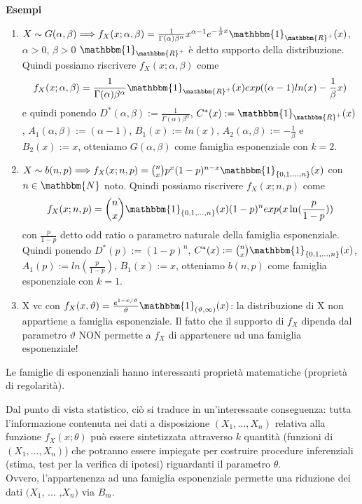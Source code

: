 \noindent \textbf{Esempi}
\begin{enumerate}
\item 
$X \sim G(\alpha, \beta) \Longrightarrow f_X(x; \alpha, \beta) = \frac{1}{\Gamma(\alpha) \beta^\alpha} x^{\alpha -1} e^{- \frac{1}{\beta} x} \mathbbm{1}_{\mathbbm{R}^+}(x)$, $\alpha >0$, $\beta >0$
$\mathbbm{1}_{\mathbbm{R}^+}$ è detto supporto della distribuzione.
Quindi possiamo riscrivere $f_X(x; \alpha, \beta)$ come
$$f_X(x; \alpha, \beta) = \frac{1}{\Gamma(\alpha) \beta^\alpha} \mathbbm{1}_{\mathbbm{R}^+}(x) exp((\alpha -1) ln(x) - \frac{1}{\beta} x)$$
e quindi ponendo $D^*(\alpha, \beta) := \frac{1}{\Gamma(\alpha) \beta^\alpha}$, $C^*(x) := \mathbbm{1}_{\mathbbm{R}^+}(x)$, $A_1(\alpha, \beta) := (\alpha -1)$, $B_1(x) := ln(x)$, $A_2(\alpha, \beta) := - \frac{1}{\beta}$ e $B_2(x) := x$, otteniamo $G(\alpha, \beta)$ come famiglia esponenziale con $k=2$.

\item $X \sim b(n,p) \Longrightarrow f_X(x; n,p) = \binom{n}{x} p^x (1-p)^{n-x} \mathbbm{1}_{\lbrace 0,1,...,n \rbrace}(x)$ con $n \in \mathbbm{N}$ noto.
Quindi possiamo riscrivere $f_X(x; n,p)$ come
$$f_X(x; n,p) = \binom{n}{x} \mathbbm{1}_{\lbrace 0,1,...,n \rbrace}(x) (1-p)^n exp(x \ln(\frac{p}{1-p}))$$ con $\frac{p}{1-p}$ detto odd ratio o parametro naturale della famiglia esponenziale.\\
Quindi ponendo $D^*(p) := (1-p)^n$, $C^*(x) := \binom{n}{x} \mathbbm{1}_{\lbrace 0,1,...,n \rbrace}(x)$, $A_1(p) := ln(\frac{p}{1-p})$, $B_1(x) := x$, otteniamo $b(n,p)$ come famiglia esponenziale con $k=1$.

\item X vc con $f_X(x,\vartheta)=\frac{e^{1-x/\vartheta}}{\vartheta}\mathbbm{1}_{(\vartheta,\infty)}(x)$: la distribuzione di X non appartiene a famiglia esponenziale.
Il fatto che il supporto di $f_X$ dipenda dal parametro $\vartheta$ NON permette a $f_X$ di appartenere ud una famiglia esponenziale!
\end{enumerate}

\begin{oss}
Le famiglie di esponenziali hanno interessanti proprietà matematiche (proprietà di regolarità).

Dal punto di vista statistico, ciò si traduce in un'interessante conseguenza: tutta l'informazione contenuta nei dati a disposizione $(X_1,...,X_n)$ relativa alla funzione $f_X (x; \theta)$ può essere sintetizzata attraverso $k$ quantità (funzioni di $(X_1,...,X_n)$) che potranno essere impiegate per costruire procedure inferenziali (stima, test per la verifica di ipotesi) riguardanti il parametro $\theta$.\\
Ovvero, l'appartenenza ad una famiglia esponenziale permette una riduzione dei dati $(X_1$, ... ,$X_n)$ via $B_m$.\end{oss}